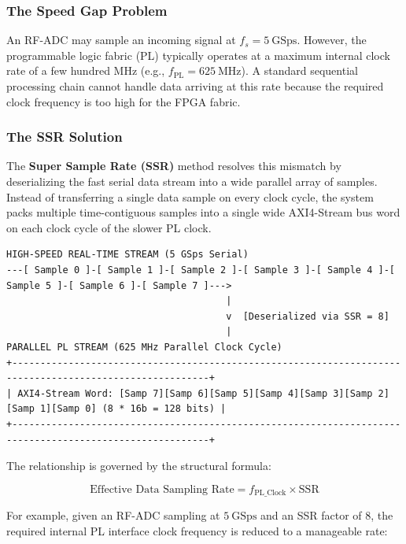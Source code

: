 \documentclass[
]{article}
\begin{document}
\subsubsection{The Speed Gap Problem}\label{the-speed-gap-problem}

An RF-ADC may sample an incoming signal at \(f_s = 5\ \text{GSps}\).
However, the programmable logic fabric (PL) typically operates at a
maximum internal clock rate of a few hundred MHz (e.g.,
\(f_{\text{PL}} = 625\ \text{MHz}\)). A standard sequential processing
chain cannot handle data arriving at this rate because the required
clock frequency is too high for the FPGA fabric.

\subsubsection{The SSR Solution}\label{the-ssr-solution}

The \textbf{Super Sample Rate (SSR)} method resolves this mismatch by
deserializing the fast serial data stream into a wide parallel array of
samples. Instead of transferring a single data sample on every clock
cycle, the system packs multiple time-contiguous samples into a single
wide AXI4-Stream bus word on each clock cycle of the slower PL clock.

\begin{verbatim}
HIGH-SPEED REAL-TIME STREAM (5 GSps Serial)
---[ Sample 0 ]-[ Sample 1 ]-[ Sample 2 ]-[ Sample 3 ]-[ Sample 4 ]-[ Sample 5 ]-[ Sample 6 ]-[ Sample 7 ]--->
                                       |
                                       v  [Deserialized via SSR = 8]
                                       |
PARALLEL PL STREAM (625 MHz Parallel Clock Cycle)
+---------------------------------------------------------------------------------------------------------+
| AXI4-Stream Word: [Samp 7][Samp 6][Samp 5][Samp 4][Samp 3][Samp 2][Samp 1][Samp 0] (8 * 16b = 128 bits) |
+---------------------------------------------------------------------------------------------------------+
\end{verbatim}

The relationship is governed by the structural formula:

\[\text{Effective Data Sampling Rate} = f_{\text{PL\_Clock}} \times \text{SSR}\]

For example, given an RF-ADC sampling at \(5\ \text{GSps}\) and an SSR
factor of 8, the required internal PL interface clock frequency is
reduced to a manageable rate:
\end{document}
